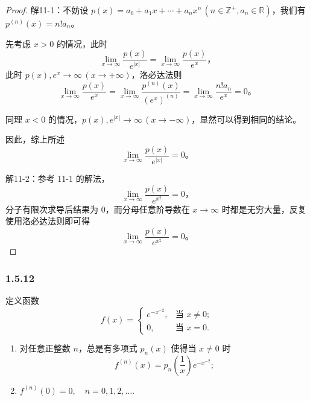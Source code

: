 \documentclass[12pt]{ctexart}
\begin{document}
\begin{proof}
解11-1：不妨设 $p(x) = a_0 + a_1 x + \cdots + a_n x^n \, (n \in \mathbb{Z}^+, a_n \in \mathbb{R})$，我们有 $p^{(n)}(x) = n! a_n$。

先考虑 $x > 0$ 的情况，此时
\[
\lim_{x \to \infty} \frac{p(x)}{e^{|x|}} = \lim_{x \to \infty} \frac{p(x)}{e^x}，
\]
此时 $p(x), e^x \to \infty \, (x \to +\infty)$，洛必达法则
\[
\lim_{x \to \infty} \frac{p(x)}{e^x} = \lim_{x \to \infty} \frac{p^{(n)}(x)}{(e^x)^{(n)}} = \lim_{x \to \infty} \frac{n! a_n}{e^x} = 0。
\]

同理 $x < 0$ 的情况，$p(x), e^{|x|} \to \infty \, (x \to -\infty)$，显然可以得到相同的结论。

因此，综上所述
\[
\lim_{x \to \infty} \frac{p(x)}{e^{|x|}} = 0。
\]

解11-2：参考 11-1 的解法，
\[
\lim_{x \to \infty} \frac{p(x)}{e^{x^2}} = 0，
\]
分子有限次求导后结果为 $0$，而分母任意阶导数在 $x \to \infty$ 时都是无穷大量，反复使用洛必达法则即可得
\[
\lim_{x \to \infty} \frac{p(x)}{e^{x^2}} = 0。
\]
\end{proof}

\subsubsection*{1.5.12}
定义函数
\[
f(x) =
\begin{cases}
e^{-x^{-2}}, & \text{当 } x \neq 0; \\
0, & \text{当 } x = 0.
\end{cases}
\]

\begin{enumerate}
\item 对任意正整数 $n$，总是有多项式 $p_n(x)$ 使得当 $x \neq 0$ 时
\[
f^{(n)}(x) = p_n\left(\frac{1}{x}\right)e^{-x^{-2}};
\]
\item $f^{(n)}(0) = 0, \quad n = 0, 1, 2, \dots.$
\end{enumerate}
\end{document}
